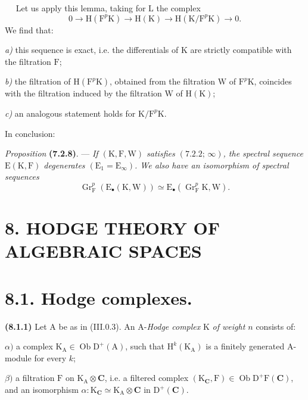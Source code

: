 \documentclass[11pt,leqno]{article}
\newcommand{\Page}[1]{\ifvmode\noindent\else\unskip\ \fi{\footnotesize\textcolor{gray}{[p.\,#1]}}\ \ignorespaces}
\begin{document}
\Page{28}
Let us apply this lemma, taking for \(\mathrm{L}\) the complex
\[
0\to\mathrm{H}(\mathrm{F}^p\mathrm{K})
\to\mathrm{H}(\mathrm{K})
\to\mathrm{H}(\mathrm{K}/\mathrm{F}^p\mathrm{K})\to 0.
\]
We find that:

\noindent
\textit{a)} this sequence is exact, i.e. the differentials of \(\mathrm{K}\) are strictly compatible with the filtration \(\mathrm{F}\);

\noindent
\textit{b)} the filtration of \(\mathrm{H}(\mathrm{F}^p\mathrm{K})\), obtained from the filtration \(\mathrm{W}\) of \(\mathrm{F}^p\mathrm{K}\), coincides with the filtration induced by the filtration \(\mathrm{W}\) of \(\mathrm{H}(\mathrm{K})\);

\noindent
\textit{c)} an analogous statement holds for \(\mathrm{K}/\mathrm{F}^p\mathrm{K}\).

In conclusion:

\textit{Proposition} \textbf{(7.2.8)}. — \textit{If \((\mathrm{K},\mathrm{F},\mathrm{W})\) satisfies \((7.2.2;\,\infty)\), the spectral sequence \(\mathrm{E}(\mathrm{K},\mathrm{F})\) degenerates \((\mathrm{E}_1=\mathrm{E}_{\infty})\). We also have an isomorphism of spectral sequences}
\[
\operatorname{Gr}_{\mathrm{F}}^p(\mathrm{E}_{\bullet}(\mathrm{K},\mathrm{W}))
\simeq\mathrm{E}_{\bullet}(\operatorname{Gr}_{\mathrm{F}}^p\mathrm{K},\mathrm{W}).
\]

\section*{8. HODGE THEORY OF ALGEBRAIC SPACES}

\section*{8.1. Hodge complexes.}

\textbf{(8.1.1)} Let \(\mathrm{A}\) be as in (III.0.3). An \(\mathrm{A}\)-\textit{Hodge complex} \(\mathrm{K}\) \textit{of weight \(n\)} consists of:

\noindent
\(\alpha)\) a complex \(\mathrm{K}_{\mathrm{A}}\in\operatorname{Ob}\mathrm{D}^{+}(\mathrm{A})\), such that \(\mathrm{H}^{k}(\mathrm{K}_{\mathrm{A}})\) is a finitely generated \(\mathrm{A}\)-module for every \(k\);

\noindent
\(\beta)\) a filtration \(\mathrm{F}\) on \(\mathrm{K}_{\mathrm{A}}\otimes\mathbf{C}\), i.e. a filtered complex \((\mathrm{K}_{\mathbf{C}},\mathrm{F})\in\operatorname{Ob}\mathrm{D}^{+}\mathrm{F}(\mathbf{C})\), and an isomorphism \(\alpha:\mathrm{K}_{\mathbf{C}}\simeq\mathrm{K}_{\mathrm{A}}\otimes\mathbf{C}\) in \(\mathrm{D}^{+}(\mathbf{C})\).
\end{document}

